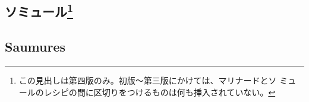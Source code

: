 \hypertarget{ux30bdux30dfux30e5ux30fcux30eb13}{%
\subsection[ソミュール]{\texorpdfstring{ソミュール\footnote{この見出しは第四版のみ。初版〜第三版にかけては、マリナードとソ
  ミュールのレシピの間に区切りをつけるものは何も挿入されていない。}}{ソミュール}}\label{ux30bdux30dfux30e5ux30fcux30eb13}}

\vspace*{-2\zw}

\hypertarget{saumures}{%
\subsection{Saumures}\label{saumures}}

 
